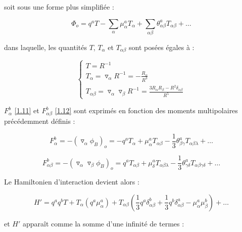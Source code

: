 	soit sous une forme plus simplifiée : 
	
	\begin{equation}
	\Phi_{o} = q^{a} T - \sum_{\alpha} \mu_{\alpha}^{a} T_{\alpha} + \sum_{\alpha\beta} \theta_{\alpha\beta}^{a} T_{\alpha\beta} + \ldots
	\end{equation}
	
        \noindent dans laquelle, les quantités $T$, $T_{\alpha}$ et $T_{\alpha\beta}$ sont posées égales à :
	
	\begin{equation}
	\begin{cases}
	T = R^{-1} \\
	T_{\alpha} = \triangledown_{\alpha} R^{-1} = - \frac{R_{\alpha}}{R^{3}}\\
	T_{\alpha\beta} = \triangledown_{\alpha} \triangledown_{\beta} R^{-1} = \frac{3R_{\alpha} R_{\beta}- R^{2}\delta_{\alpha\beta}}{R^{5}}
	\end{cases}
	\end{equation}
	
	$F_{\alpha}^{b}$ \ref{1.11} et $F_{\alpha\beta}^{b}$ \ref{1.12} sont exprimés en fonction des moments multipolaires \cite{buckingham1965general} précédemment définis : 
	
	\begin{equation}
	F_{\alpha}^{b} = -(\triangledown_{\alpha}\phi_{B})_{o} = -q^{a} T_{\alpha} + \mu_{\alpha}^{a} T_{\alpha\beta} - \frac{1}{3} \theta_{\beta\gamma}^{a} T_{\alpha\beta\lambda} + \ldots 
	\end{equation}
	
	\begin{equation}
	F_{\alpha\beta}^{b} = -(\triangledown_{\alpha} \triangledown_{\beta}\phi_{B})_{o} = q^{a} T_{\alpha\beta} + \mu_{\delta}^{a} T_{\alpha\beta\lambda} - \frac{1}{3} \theta_{\gamma\delta}^{a} T_{\alpha\beta\gamma\delta} + \ldots 
	\end{equation}
	
	Le Hamiltonien d'interaction devient alors : 
	
	\begin{equation}
	H' = q^{a} q^{b} T + T_{\alpha}(q^{a} \mu_{\alpha}^{a}) + T_{\alpha\beta} (\frac{1}{3}q^{a}\delta^{b}_{\alpha\beta}+ \frac{1}{3} q^{b}\delta^{a}_{\alpha\beta} - \mu_{\alpha}^{a}\mu_{\beta}^{b}) + \ldots  \label{1.19}
	\end{equation}
	
	\noindent et $H'$ apparaît comme la somme d'une infinité de termes : 
	
